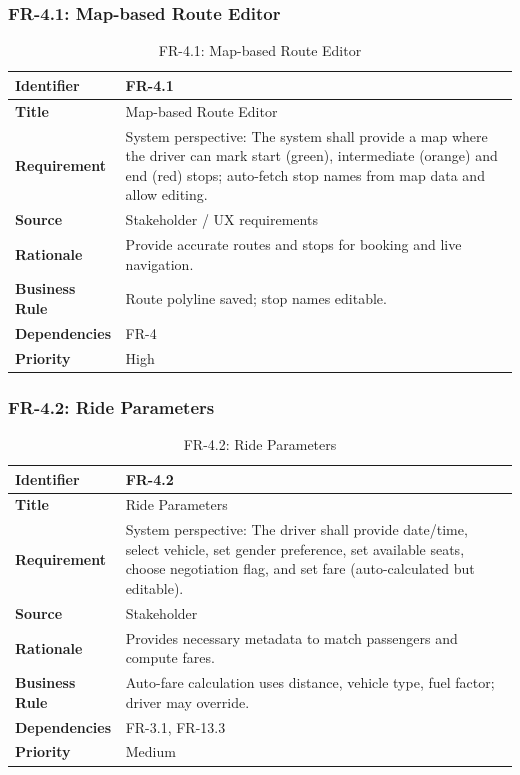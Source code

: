 \subsubsection{FR-4.1: Map-based Route Editor}

\begin{longtable}{|p{3cm}|p{12cm}|}
\caption{FR-4.1: Map-based Route Editor}
\label{tab:fr-4-1} \\
\hline
\rowcolor{lightgray!30}
\textbf{Identifier} & FR-4.1 \\
\hline
\textbf{Title} & Map-based Route Editor \\
\hline
\textbf{Requirement} & System perspective: The system shall provide a map where the driver can mark start (green), intermediate (orange) and end (red) stops; auto-fetch stop names from map data and allow editing. \\
\hline
\textbf{Source} & Stakeholder / UX requirements \\
\hline
\textbf{Rationale} & Provide accurate routes and stops for booking and live navigation. \\
\hline
\textbf{Business Rule} & Route polyline saved; stop names editable. \\
\hline
\textbf{Dependencies} & FR-4 \\
\hline
\textbf{Priority} & High \\
\hline
\end{longtable}

\subsubsection{FR-4.2: Ride Parameters}

\begin{longtable}{|p{3cm}|p{12cm}|}
\caption{FR-4.2: Ride Parameters}
\label{tab:fr-4-2} \\
\hline
\rowcolor{lightgray!30}
\textbf{Identifier} & FR-4.2 \\
\hline
\textbf{Title} & Ride Parameters \\
\hline
\textbf{Requirement} & System perspective: The driver shall provide date/time, select vehicle, set gender preference, set available seats, choose negotiation flag, and set fare (auto-calculated but editable). \\
\hline
\textbf{Source} & Stakeholder \\
\hline
\textbf{Rationale} & Provides necessary metadata to match passengers and compute fares. \\
\hline
\textbf{Business Rule} & Auto-fare calculation uses distance, vehicle type, fuel factor; driver may override. \\
\hline
\textbf{Dependencies} & FR-3.1, FR-13.3 \\
\hline
\textbf{Priority} & Medium \\
\hline
\end{longtable}

